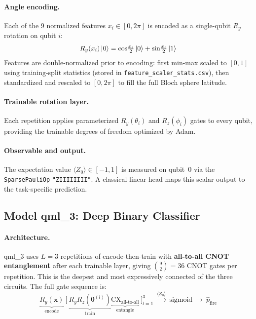 \documentclass[11pt,a4paper]{article}
\begin{document}
\paragraph{Angle encoding.}
Each of the 9 normalized features $x_i \in [0, 2\pi]$ is encoded as a
single-qubit $R_y$ rotation on qubit $i$:
\begin{equation}
    R_y(x_i)\ket{0} = \cos\!\tfrac{x_i}{2}\ket{0} + \sin\!\tfrac{x_i}{2}\ket{1}
\end{equation}
Features are double-normalized prior to encoding: first min-max scaled to $[0,1]$
using training-split statistics (stored in \texttt{feature\_scaler\_stats.csv}),
then standardized and rescaled to $[0, 2\pi]$ to fill the full Bloch sphere latitude.

\paragraph{Trainable rotation layer.}
Each repetition applies parameterized $R_y(\theta_i)$ and $R_z(\phi_i)$ gates
to every qubit, providing the trainable degrees of freedom optimized by Adam.

\paragraph{Observable and output.}
The expectation value $\langle Z_0 \rangle \in [-1, 1]$ is measured on qubit~0
via the \texttt{SparsePauliOp} \texttt{"ZIIIIIIII"}. A classical linear head
maps this scalar output to the task-specific prediction.

\subsection{Model qml\_3: Deep Binary Classifier}

\paragraph{Architecture.}
qml\_3 uses $L = 3$ repetitions of encode-then-train with \textbf{all-to-all CNOT
entanglement} after each trainable layer, giving $\binom{9}{2} = 36$ CNOT gates
per repetition. This is the deepest and most expressively connected of the three
circuits. The full gate sequence is:
\[
  \underbrace{R_y(\mathbf{x})}_{\text{encode}}\ \Biggl[\ \underbrace{R_y R_z(\boldsymbol{\theta}^{(l)})}_{\text{train}} \underbrace{\text{CX}_{\text{all-to-all}}}_{\text{entangle}}\ \Biggr]_{l=1}^{3}\ \xrightarrow{\langle Z_0\rangle}\ \text{sigmoid}\ \rightarrow\ \hat{p}_{\text{fire}}
\]
\end{document}
